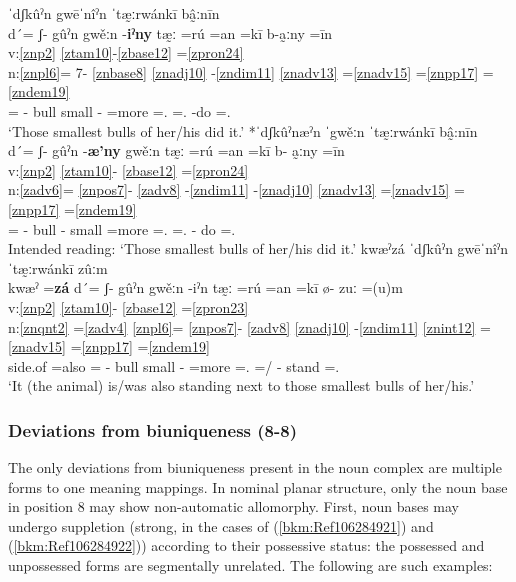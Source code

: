 \documentclass[output=paper]{langscibook}
\begin{document}
\ea\label{bkm:Ref82614562}
{ˈdʃkûˀn gwēˈnîˀn ˈtæ̰ːrwánkī bâ̰ːnīn}\\
\gllll d´= ʃ{}- gûˀn  gwěːn -\textbf{iˀny} tæ̰ː =rú =an =kī b-a̰ːny =īn\\
v:\ref{znp2} {} {} {} {} {} {} {} {} \ref{ztam10}-\ref{zbase12} =\ref{zpron24}\\
n:\ref{znpl6}= 7{}- \ref{znbase8} \ref{znadj10} {}-\ref{zndim11} \ref{znadv13} =\ref{znadv15} =\ref{znpp17} =\ref{zndem19} \\
\Pl{}= \Poss{}- bull small -\textbf{\Dim{}} \Intens{} =more =\Third\Sg{}.\Inf{} =\Dem.\Tprl{} \Compl-do =\Third\Sg.\Inan{} \\
\glt `Those smallest bulls of her/his did it.'
\ex\label{ex:key:zap:109}
{*ˈdʃkûˀnæˀn   ˈgwěːn ˈtæ̰ːrwánkī bâ̰:nīn}\\
\gllll d´= ʃ{}- gûˀn -\textbf{æ'ny} gwěːn tæ̰ː =rú =an =kī b- a̰ːny =īn\\
v:\ref{znp2} {} {} {} {} {} {} {} {} \ref{ztam10}- \ref{zbase12} =\ref{zpron24}\\
n:\ref{zadv6}= \ref{znpos7}{}- \ref{zadv8} {}-\ref{zndim11} -\ref{znadj10} \ref{znadv13} =\ref{znadv15} =\ref{znpp17} =\ref{zndem19}\\
\Pl{}= \Poss{}- bull -\textbf{\Dim{}} small \Intens{} =more =\Third\Sg{}.\Inf{} =\Dem.\Tprl{} \Compl{}- do =\Third\Sg.\Inan{}\\
\glt Intended reading: `Those smallest bulls of her/his did it.'
\ex\label{bkm:Ref82614587}
{kwæˀzá ˈdʃkûˀn gwēˈnîˀn  ˈtæ̰ːrwánkī zûːm}\\
\gllll kwæˀ =\textbf{zá} d´= ʃ{}- gûˀn gwěːn -iˀn tæ̰ː =rú =an =kī ø- zuː =(u)m\\
v:\ref{znp2} {} {} {} {} {} {} {} {} {} {} \ref{ztam10}- \ref{zbase12} =\ref{zpron23}\\
n:\ref{znqnt2} =\ref{zadv4} \ref{znpl6}= \ref{znpos7}{}- \ref{zadv8} \ref{znadj10} {}-\ref{zndim11} \ref{znint12} =\ref{znadv15} =\ref{znpp17} =\ref{zndem19} \\
side.of =also \Pl{}= \Poss{}- bull small -\Dim{} \Intens{} =more =\Third\Sg{}.\Inf{} =\Dem/\Tprl{} \Stat{}- stand =\Third\Sg.\Anml{}\\
\glt `It (the animal) is/was also standing next to those smallest bulls of her/his.'
\z

\subsubsection{Deviations from biuniqueness (8-8)}

The only deviations from biuniqueness present in the noun complex are multiple forms to one meaning mappings. In nominal planar structure, only the noun base in position 8 may show non-automatic allomorphy. First, noun bases may undergo suppletion (strong, in the cases of (\ref{bkm:Ref106284921}) and (\ref{bkm:Ref106284922})) according to their possessive status: the possessed and unpossessed forms are segmentally unrelated. The following are such examples:
\end{document}
